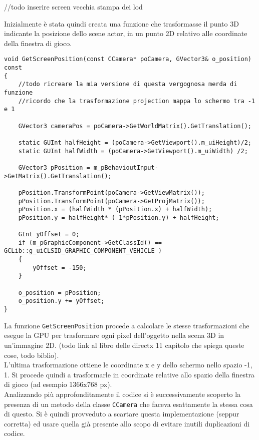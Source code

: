 //todo inserire screen vecchia stampa dei lod

Inizialmente è stata quindi creata una funzione che trasformasse il punto 3D indicante la posizione dello scene actor, in un punto 2D relativo alle coordinate della finestra di gioco.\\

\begin{lstlisting}[style=maurizio-code]
void GetScreenPosition(const CCamera* poCamera, GVector3& o_position) const
{
	//todo ricreare la mia versione di questa vergognosa merda di funzione
	//ricordo che la trasformazione projection mappa lo schermo tra -1 e 1
	
	GVector3 cameraPos = poCamera->GetWorldMatrix().GetTranslation();
	
	static GUInt halfHeight = (poCamera->GetViewport().m_uiHeight)/2;
	static GUInt halfWidth = (poCamera->GetViewport().m_uiWidth) /2;
	
	GVector3 pPosition = m_pBehavioutInput->GetMatrix().GetTranslation();
	
	pPosition.TransformPoint(poCamera->GetViewMatrix());
	pPosition.TransformPoint(poCamera->GetProjMatrix());
	pPosition.x = (halfWidth * (pPosition.x) + halfWidth);
	pPosition.y = halfHeight* (-1*pPosition.y) + halfHeight;
	
	GInt yOffset = 0;
	if (m_pGraphicComponent->GetClassId() == GCLib::g_uiCLSID_GRAPHIC_COMPONENT_VEHICLE )
	{
		yOffset = -150;
	}
	
	o_position = pPosition;
	o_position.y += yOffset;
}
\end{lstlisting}

La funzione \texttt{GetScreenPosition} procede a calcolare le stesse trasformazioni che esegue la GPU per trasformare ogni pixel dell'oggetto nella scena 3D in un'immagine 2D. (todo link al libro delle directx 11 capitolo che spiega queste cose, todo biblio).\\

L'ultima trasformazione ottiene le coordinate x e y dello schermo nello spazio -1, 1. Si procede quindi a trasformarle in coordinate relative allo spazio della finestra di gioco (ad esempio 1366x768 px).\\

Analizzando più approfonditamente il codice si è successivamente scoperto la presenza di un metodo della classe \texttt{CCamera} che faceva esattamente la stessa cosa di questo. Si è quindi provveduto a scartare questa implementazione (seppur corretta) ed usare quella già presente allo scopo di evitare inutili duplicazioni di codice.\\


